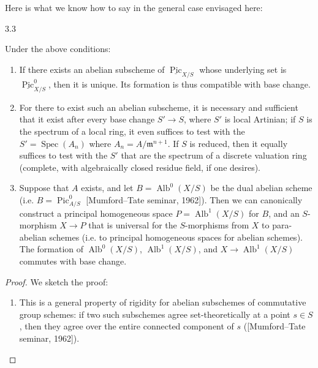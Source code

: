   Here is what we know how to say in the general case envisaged here:\begin{theorem}{3.3}\label{fga3.vi-3-theorem-3.3}\skipsinglepar\par{}Under the above conditions:

    
 \begin{enumerate}
      
 \item[i.]
        If there exists an abelian subscheme of \(\underline {\operatorname {Pic}}_{X/S}\) whose underlying set is \(\underline {\operatorname {Pic}}_{X/S}^0\), then it is unique.
        Its formation is thus compatible with base change.
      

      
 \item[ii.]
        For there to exist such an abelian subscheme, it is necessary and sufficient that it exist after every base change \(S'\to  S\), where \(S'\) is local Artinian;
        if \(S\) is the spectrum of a local ring, it even suffices to test with the \(S'=\operatorname {Spec}(A_n)\) where \(A_n=A/\mathfrak {m}^{n+1}\).
        If \(S\) is reduced, then it equally suffices to test with the \(S'\) that are the spectrum of a discrete valuation ring (complete, with algebraically closed residue field, if one desires).
      

      
 \item[iii.]
        Suppose that \(A\) exists, and let \(B=\operatorname {Alb}^0(X/S)\) be the dual abelian scheme (i.e. \(B=\operatorname {Pic}_{A/S}^0\) [Mumford–Tate seminar, 1962]).
        Then we can canonically construct a principal homogeneous space \(P=\operatorname {Alb}^1(X/S)\) for \(B\), and an \(S\)-morphism \(X\to  P\) that is universal for the \(S\)-morphisms from \(X\) to para-abelian schemes (i.e. to principal homogeneous spaces for abelian schemes).
        The formation of \(\operatorname {Alb}^0(X/S)\), \(\operatorname {Alb}^1(X/S)\), and \(X\to \operatorname {Alb}^1(X/S)\) commutes with base change.
      

    \end{enumerate}\begin{proof}\par{}We sketch the proof:\begin{enumerate}\item{}This is a general property of rigidity for abelian subschemes of commutative group schemes: if two such subschemes agree set-theoretically at a point \(s\in  S\), then they agree over the entire connected component of \(s\) ([Mumford–Tate seminar, 1962]).
        

\end{enumerate}
\end{proof}
\end{theorem}
